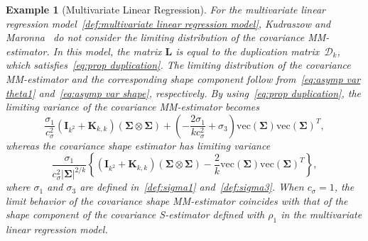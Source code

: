 \documentclass{article}
\numberwithin{equation}{section}
\theoremstyle{plain}
\newtheorem{example}{Example}
\newcommand{\vc}{\mathrm{vec}}
\newcommand{\bSigma}{\mathbf{\Sigma}}
\newcommand{\bI}{\mathbf{I}}
\newcommand{\bL}{\mathbf{L}}
\newcommand{\bK}{\mathbf{K}}
\begin{document}
\begin{example}[Multivariate Linear Regression]
For the multivariate linear regression model~\eqref{def:multivariate linear regression model}, 
Kudraszow and Maronna~\cite{kudraszow-maronna2011} do not consider the
limiting distribution of the covariance MM-estimator.
In this model, the matrix $\bL$ is equal to the duplication matrix~$\mathcal{D}_k$,
which satisfies~\eqref{eq:prop duplication}.
The limiting distribution of the covariance MM-estimator
and the corresponding shape component follow from~\eqref{eq:asymp var theta1}
and~\eqref{eq:asymp var shape}, respectively.
By using~\eqref{eq:prop duplication}, the limiting variance of the covariance MM-estimator becomes
\begin{equation}
\label{eq:asymp var cov MM mult regr}
\frac{\sigma_1}{c_\sigma^2}
\left(
\bI_{k^2}+\bK_{k,k}
\right)(\bSigma\otimes\bSigma)
+
\left(
-\frac{2\sigma_1}{kc_\sigma^2}
+
\sigma_3
\right)
\vc(\bSigma)
\vc(\bSigma)^T,
\end{equation}
whereas the covariance shape estimator has limiting variance
\begin{equation}
\label{eq:asymp var shape MM mult regr}
\frac{\sigma_1}{c_\sigma^2|\bSigma|^{2/k}}
\left\{
\left(
\bI_{k^2}+\bK_{k,k}
\right)(\bSigma\otimes\bSigma)
-
\frac{2}{k}
\vc(\bSigma)
\vc(\bSigma)^T
\right\},
\end{equation}
where $\sigma_1$ and $\sigma_3$ are defined in~\eqref{def:sigma1} and~\eqref{def:sigma3}.
When $c_\sigma=1$, the limit behavior of the covariance shape MM-estimator 
coincides with that of the shape component of the covariance S-estimator defined with $\rho_1$
in the multivariate linear regression model.
\end{example}
\end{document}
